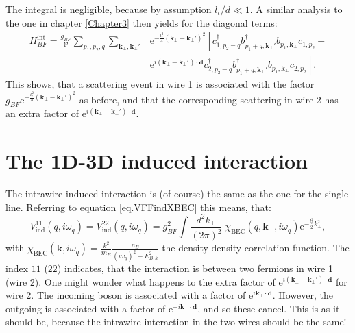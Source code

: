 The integral is negligible, because by assumption $l_t/d \ll 1$. A similar analysis to the one in chapter \ref{Chapter3} then yields for the diagonal terms:
\begin{align}
H_{BF}^\text{int} = \frac{g_{BF}}{\mathcal{V}}\sum_{p_1,p_2,q} \sum_{\mathbf{k}_\perp, \mathbf{k}_\perp'} & \text{e}^{-\frac{l_t^2}{4}(\mathbf{k}_\perp - \mathbf{k}_\perp')^2}\left[ c^\dagger_{1,p_2-q} b^\dagger_{p_1+q, \mathbf{k}_\perp'} b_{p_1,\mathbf{k}_\perp}c_{1,p_2} + \right. \nonumber \\
& \left. \text{e}^{i(\mathbf{k}_\perp - \mathbf{k}_\perp')\cdot \mathbf{d}}c_{2,p_2-q}^\dagger b_{p_1+q, \mathbf{k}_\perp'}^\dagger b_{p_1,\mathbf{k}_\perp}c_{2,p_2} \right].
\end{align}
This shows, that a scattering event in wire 1 is associated with the factor $g_{BF} \text{e}^{-\frac{l_t^2}{4}(\mathbf{k}_\perp - \mathbf{k}_\perp')^2}$ as before, and that the corresponding scattering in wire 2 has an extra factor of $\text{e}^{i(\mathbf{k}_\perp - \mathbf{k}_\perp')\cdot \mathbf{d}}$. 

\section{The 1D-3D induced interaction}
The intrawire induced interaction is (of course) the same as the one for the single line. Referring to equation \ref{eq.VFFindXBEC} this means, that:
\begin{equation}
V_{\text{ind}}^{11}(q,i\omega_q) = V_{\text{ind}}^{22}(q,i\omega_q) = g_{BF}^2\int\frac{d^2k_\perp}{(2\pi)^2}\; \chi_\text{BEC}(q,\mathbf{k}_\perp,i\omega_q)\text{e}^{-\frac{l_t^2}{2}k_\perp^2}, 
\label{eq.VFF1122indXBEC} 
\end{equation}
with $\chi_\text{BEC}(\mathbf{k},i\omega_q) = \frac{k^2}{m_B}\frac{n_B}{(i\omega_q)^2-E_{B,k}^2}$ the density-density correlation function. The index $11$ ($22$) indicates, that the interaction is between two fermions in wire 1 (wire 2). One might wonder what happens to the extra factor of $\text{e}^{i(\mathbf{k}_\perp - \mathbf{k}_\perp')\cdot \mathbf{d}}$ for wire 2. The incoming boson is associated with a factor of $\text{e}^{i\mathbf{k}_\perp\cdot \mathbf{d}}$. However, the outgoing is associated with a factor of $\text{e}^{-i\mathbf{k}_\perp\cdot \mathbf{d}}$, and so these cancel. This is as it should be, because the intrawire interaction in the two wires should be the same!

